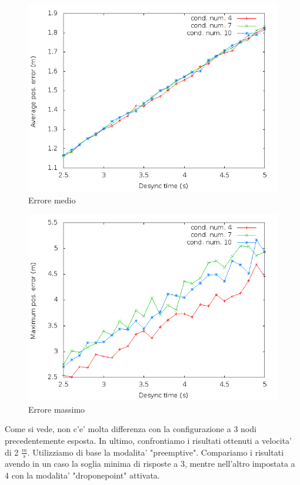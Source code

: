 \begin{figure}[H]
    \centering
    \includegraphics[scale=0.5]{octagonsimulation/avposerrorreq4preempt1drop1speed1.png}
    \caption{Errore medio}
    \label{fig:octagonsimulation/avposerrorreq4preempt1drop1speed1}
\end{figure}
\begin{figure}[H]
    \centering
    \includegraphics[scale=0.5]{octagonsimulation/maxposerrorreq4preempt1drop1speed1.png}
    \caption{Errore massimo}
    \label{fig:octagonsimulation/avposerrorreq4preempt1drop1speed1}
\end{figure}
Come si vede, non c'e' molta differenza con la configurazione a 3 nodi precedentemente esposta.
In ultimo, confrontiamo i risultati ottenuti a velocita' di 2 $\frac{m}{s}$. Utilizziamo di base la modalita' "preemptive". Compariamo i risultati avendo in un caso la soglia minima di risposte a 3, mentre nell'altro impostata a 4 con la modalita' "droponepoint" attivata.
